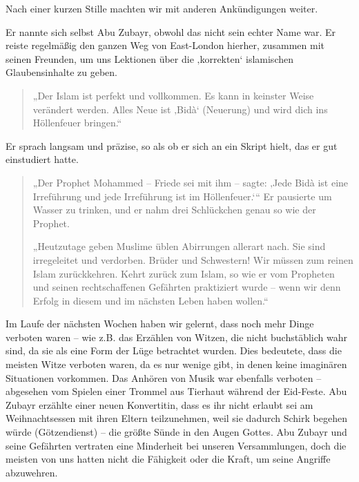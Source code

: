 \documentclass[12pt]{memoir}
\begin{document}
Nach einer kurzen Stille machten wir mit anderen Ankündigungen weiter.

Er nannte sich selbst Abu Zubayr, obwohl das nicht sein echter Name war.
Er reiste regelmäßig den ganzen Weg von East-London hierher,
zusammen mit seinen Freunden, um uns Lektionen über die ‚korrekten‘
islamischen Glaubensinhalte zu geben.

\begin{quote}
„Der Islam ist perfekt und vollkommen.
Es kann in keinster Weise verändert werden.
Alles Neue ist ‚Bid\`a‘ (Neuerung) und wird dich ins Höllenfeuer bringen.“
\end{quote}

Er sprach langsam und präzise,
so als ob er sich an ein Skript hielt,
das er gut einstudiert hatte.

\begin{quote}
„Der Prophet Mohammed – Friede sei mit ihm – sagte:
‚Jede Bid\`a ist eine Irreführung und jede Irreführung ist im Höllenfeuer.‘“
Er pausierte um Wasser zu trinken,
und er nahm drei Schlückchen genau so wie der Prophet.

„Heutzutage geben Muslime üblen Abirrungen allerart nach.
Sie sind irregeleitet und verdorben.
Brüder und Schwestern!
Wir müssen zum reinen Islam zurückkehren.
Kehrt zurück zum Islam, so wie er vom Propheten
und seinen rechtschaffenen Gefährten praktiziert wurde –
wenn wir denn Erfolg in diesem und im nächsten Leben haben wollen.“
\end{quote}

Im Laufe der nächsten Wochen haben wir gelernt,
dass noch mehr Dinge verboten waren –
wie z.B. das Erzählen von Witzen, die nicht buchstäblich wahr sind,
da sie als eine Form der Lüge betrachtet wurden.
Dies bedeutete, dass die meisten Witze verboten waren,
da es nur wenige gibt, in denen keine imaginären Situationen vorkommen.
Das Anhören von Musik war ebenfalls verboten –
abgesehen vom Spielen einer Trommel aus Tierhaut während der Eid-Feste.
Abu Zubayr erzählte einer neuen Konvertitin,
dass es ihr nicht erlaubt sei am Weihnachtsessen mit ihren Eltern teilzunehmen,
weil sie dadurch Schirk begehen würde (Götzendienst) –
die größte Sünde in den Augen Gottes.
Abu Zubayr und seine Gefährten vertraten
eine Minderheit bei unseren Versammlungen,
doch die meisten von uns hatten nicht die Fähigkeit
oder die Kraft, um seine Angriffe abzuwehren.
\end{document}
